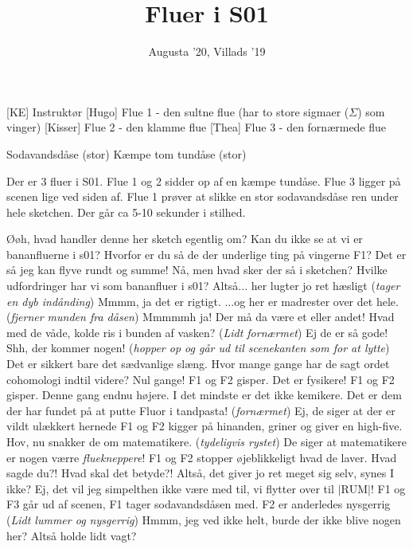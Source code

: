 \documentclass[a4paper,11pt]{article}
\title{Fluer i S01}
\author{Augusta '20, Villads '19}
\begin{document}
\maketitle

\begin{roles}
[KE] Instruktør
[Hugo] Flue 1 - den sultne flue (har to store sigmaer ($\Sigma$) som vinger)
[Kisser] Flue 2 - den klamme flue 
[Thea] Flue 3 - den fornærmede flue 
\end{roles}

\begin{props}
     Sodavandsdåse (stor) 
     Kæmpe tom tundåse (stor) 
\end{props}


\begin{sketch}
\scene Der er 3 fluer i S01. Flue 1 og 2 sidder op af en kæmpe tundåse. Flue 3 ligger på scenen lige ved siden af. Flue 1 prøver at slikke en stor sodavandsdåse ren under hele sketchen. Der går ca 5-10 sekunder i stilhed.

 Øøh, hvad handler denne her sketch egentlig om? 
 Kan du ikke se at vi er bananfluerne i s01?
 Hvorfor er du så de der underlige ting på vingerne F1?
 Det er så jeg kan flyve rundt og summe!
 Nå, men hvad sker der så i sketchen? Hvilke udfordringer har vi som bananfluer i s01? 
 Altså... her lugter jo ret hæsligt
 (\textit{tager en dyb indånding}) Mmmm, ja det er rigtigt.
 ...og her er madrester over det hele.
 (\textit{fjerner munden fra dåsen}) Mmmmmh ja! 
 Der må da være et eller andet! Hvad med de våde, kolde ris i bunden af vasken? 
 (\textit{Lidt fornærmet}) Ej de er så gode! 
 Shh, der kommer nogen! (\textit{hopper op og går ud til scenekanten som for at lytte})
 Det er sikkert bare det sædvanlige slæng. Hvor mange gange har de sagt ordet cohomologi indtil videre?
 Nul gange!
\scene F1 og F2 gisper.
 Det er fysikere!
\scene F1 og F2 gisper. Denne gang endnu højere.
 I det mindste er det ikke kemikere. Det er dem der har fundet på at putte Fluor i tandpasta! 
 (\textit{fornærmet}) Ej, de siger at der er vildt ulækkert hernede
\scene F1 og F2 kigger på hinanden, griner og giver en high-five.
 Hov, nu snakker de om matematikere. (\textit{tydeligvis rystet}) De siger at matematikere er nogen værre \textit{fluekneppere}!
\scene F1 og F2 stopper øjeblikkeligt hvad de laver.
 Hvad sagde du?! Hvad skal det betyde?!
 Altså, det giver jo ret meget sig selv, synes I ikke?
 Ej, det vil jeg simpelthen ikke være med til, vi flytter over til $|\text{RUM}|!$
\scene F1 og F3 går ud af scenen, F1 tager sodavandsdåsen med. F2 er anderledes nysgerrig
 (\textit{Lidt lummer og nysgerrig}) Hmmm, jeg ved ikke helt, burde der ikke blive nogen her? Altså holde lidt vagt?
\end{sketch}
\end{document}
